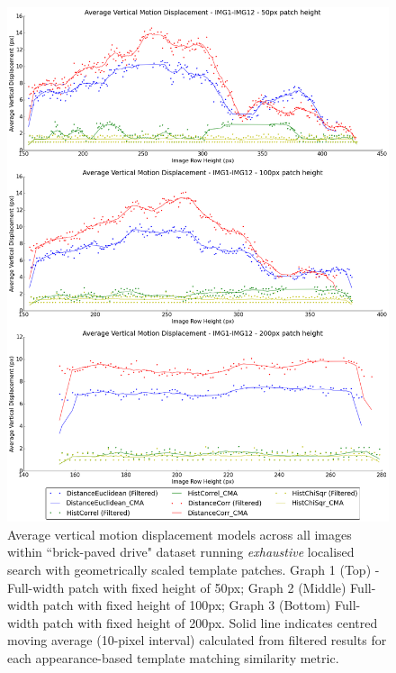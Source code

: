 \clearpage
\begin{figure}[ht!]
\centering
\includegraphics[scale=0.3]{images/results/wiltshire_outside_10cm_scaled_exhaustive}
\caption{Average vertical motion displacement models across all images within ``brick-paved drive" dataset running \textit{exhaustive} localised search with geometrically scaled template patches. Graph 1 (Top) - Full-width patch with fixed height of 50px; Graph 2 (Middle) Full-width patch with fixed height of 100px; Graph 3 (Bottom) Full-width patch with fixed height of 200px. Solid line indicates centred moving average (10-pixel interval) calculated from filtered results for each appearance-based template matching similarity metric.}
\label{fig:ex3_2_2}
\end{figure}

